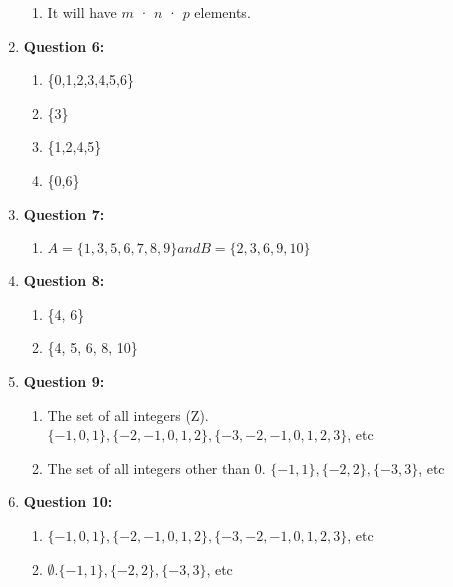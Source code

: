 \documentclass[11pt]{article}
\begin{document}
\begin{enumerate}
    \begin{enumerate}[label=(\alph*)]
        \item It will have $m$ · $n$ · $p$ elements.
    \end{enumerate}
    \item \textbf{Question 6:}
    \begin{enumerate}[label=(\alph*)]
        \item \{0,1,2,3,4,5,6\}
        \item \{3\}
        \item \{1,2,4,5\}
        \item \{0,6\}
    \end{enumerate}
    \item \textbf{Question 7:}
    \begin{enumerate}[label=(\alph*)]
        \item $A = \{1,3,5,6,7,8,9\} and B = \{2,3,6,9,10\}$
    \end{enumerate}
    \item \textbf{Question 8:}
    \begin{enumerate}[label=(\alph*)]
        \item \{4, 6\}
        \item \{4, 5, 6, 8, 10\}
    \end{enumerate}
    \item \textbf{Question 9:}
    \begin{enumerate}[label=(\alph*)]
        \item The set of all integers (Z). $\{−1,0,1\},\{−2,−1,0,1,2\}, \{−3,−2,−1,0,1,2,3\}$, etc
        \item The set of all integers other than 0. $\{−1, 1\}, \{−2, 2\}, \{−3, 3\}$, etc
    \end{enumerate}
    \item \textbf{Question 10:}
    \begin{enumerate}[label=(\alph*)]
        \item $\{−1, 0, 1\}, \{−2, −1, 0, 1, 2\},\{−3, −2, −1, 0, 1, 2, 3\}$, etc
        \item $\emptyset.\{−1,1\}, \{−2,2\}, \{−3,3\}$, etc
    \end{enumerate}
\end{enumerate}
\end{document}
